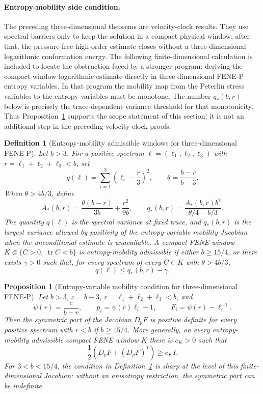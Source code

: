 \documentclass[11pt]{article}
\newtheorem{proposition}{Proposition}[section]
\newtheorem{definition}{Definition}[section]
\newcommand{\tr}{\operatorname{tr}}
\begin{document}
\paragraph{Entropy-mobility side condition.}
The preceding three-dimensional theorems are velocity-clock results.  They use
spectral barriers only to keep the solution in a compact physical window; after
that, the pressure-free high-order estimate closes without a three-dimensional
logarithmic conformation energy.  The following finite-dimensional calculation is
included to locate the obstruction faced by a stronger program: deriving the
compact-window logarithmic estimate directly in three-dimensional FENE-P entropy
variables.  In that program the mobility map from the Peterlin stress variables
to the entropy variables must be monotone.  The number \(q_*(b,r)\) below is
precisely the trace-dependent variance threshold for that monotonicity.  Thus
Proposition~\ref{prop:3d-fene-mobility} supports the scope statement of this
section; it is not an additional step in the preceding velocity-clock proofs.

\begin{definition}[Entropy-mobility admissible windows for three-dimensional FENE-P]
\label{def:3d-fene-mobility-window}
Let \(b>3\).  For a positive spectrum
\(\ell=(\ell_1,\ell_2,\ell_3)\) with \(r=\ell_1+\ell_2+\ell_3<b\), set
\[
  q(\ell)=\sum_{i=1}^3\left(\ell_i-\frac r3\right)^2,\qquad
  \theta=\frac{b-r}{b-3}.
\]
When \(\theta>4b/3\), define
\[
  A_*(b,r)
  =\frac{\theta(b-r)}{3b}+\frac{r^2}{9b},
  \qquad
  q_*(b,r)
  =\frac{A_*(b,r)b^2}{\theta/4-b/3}.
\]
The quantity \(q(\ell)\) is the spectral variance at fixed trace, and
\(q_*(b,r)\) is the largest variance allowed by positivity of the
entropy-variable mobility Jacobian when the unconditional estimate is
unavailable.  A compact FENE window \(K\Subset\{C>0,\ \tr C<b\}\) is
entropy-mobility admissible if either \(b\ge15/4\), or there exists
\(\gamma>0\) such that, for every spectrum of every \(C\in K\) with
\(\theta>4b/3\),
\[
  q(\ell)\le q_*(b,r)-\gamma .
\]
\end{definition}

\begin{proposition}[Entropy-variable mobility condition for three-dimensional FENE-P]
\label{prop:3d-fene-mobility}
Let \(b>3\), \(c=b-3\), \(r=\ell_1+\ell_2+\ell_3<b\), and
\[
  \psi(r)=\frac{c}{b-r},\qquad
  p_i=\psi(r)\ell_i-1,\qquad
  F_i=\psi(r)-\ell_i^{-1}.
\]
Then the symmetric part of the Jacobian \(D_pF\) is positive definite for every
positive spectrum with \(r<b\) if \(b\ge15/4\).  More generally, on every
entropy-mobility admissible compact FENE window \(K\) there is \(c_K>0\) such that
\[
  \frac12\left(D_pF+(D_pF)^T\right)\ge c_K I .
\]
For \(3<b<15/4\), the condition in Definition~\ref{def:3d-fene-mobility-window}
is sharp at the level of this finite-dimensional Jacobian: without an
anisotropy restriction, the symmetric part can be indefinite.
\end{proposition}
\end{document}
